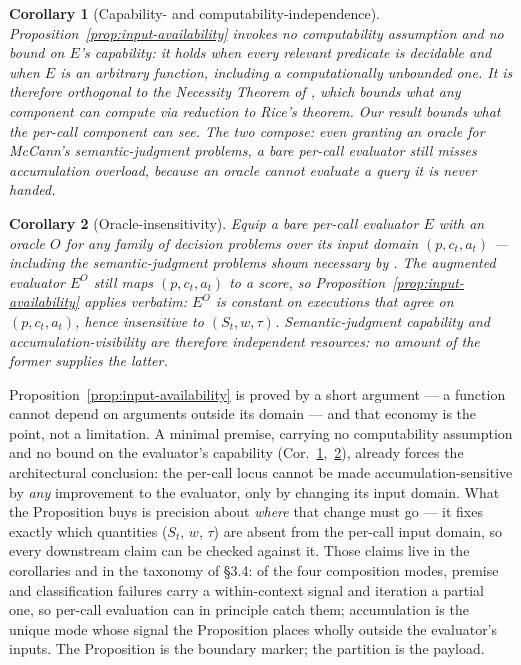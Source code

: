 \documentclass[11pt]{article}
\newtheorem{corollary}{Corollary}[proposition]
\begin{document}
\begin{corollary}[Capability- and computability-independence]
\label{cor:orthogonality}
Proposition~\ref{prop:input-availability} invokes no computability assumption and no bound on $E$'s capability: it holds when every relevant predicate is decidable and when $E$ is an arbitrary function, including a computationally unbounded one. It is therefore orthogonal to the Necessity Theorem of \citet{mccann2026governance}, which bounds what any component can \emph{compute} via reduction to Rice's theorem. Our result bounds what the per-call component can \emph{see}. The two compose: even granting an oracle for McCann's semantic-judgment problems, a bare per-call evaluator still misses accumulation overload, because an oracle cannot evaluate a query it is never handed.
\end{corollary}

\begin{corollary}[Oracle-insensitivity]
\label{cor:oracle}
Equip a bare per-call evaluator $E$ with an oracle $O$ for any family of decision problems over its input domain $(p, c_t, a_t)$ --- including the semantic-judgment problems shown necessary by \citet{mccann2026governance}. The augmented evaluator $E^{O}$ still maps $(p, c_t, a_t)$ to a score, so Proposition~\ref{prop:input-availability} applies verbatim: $E^{O}$ is constant on executions that agree on $(p, c_t, a_t)$, hence insensitive to $(S_t, w, \tau)$. Semantic-judgment capability and accumulation-visibility are therefore independent resources: no amount of the former supplies the latter.
\end{corollary}

Proposition~\ref{prop:input-availability} is proved by a short argument --- a function cannot depend on arguments outside its domain --- and that economy is the point, not a limitation. A minimal premise, carrying no computability assumption and no bound on the evaluator's capability (Cor.~\ref{cor:orthogonality},~\ref{cor:oracle}), already forces the architectural conclusion: the per-call locus cannot be made accumulation-sensitive by \emph{any} improvement to the evaluator, only by changing its input domain. What the Proposition buys is precision about \emph{where} that change must go --- it fixes exactly which quantities ($S_t$, $w$, $\tau$) are absent from the per-call input domain, so every downstream claim can be checked against it. Those claims live in the corollaries and in the taxonomy of §3.4: of the four composition modes, premise and classification failures carry a within-context signal and iteration a partial one, so per-call evaluation can in principle catch them; accumulation is the unique mode whose signal the Proposition places wholly outside the evaluator's inputs. The Proposition is the boundary marker; the partition is the payload.
\end{document}
